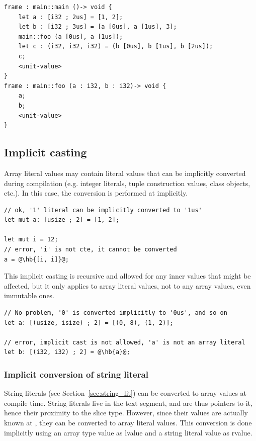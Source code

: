 \begin{lstlisting}[style=myilVerb]
frame : main::main ()-> void {
    let a : [i32 ; 2us] = [1, 2];
    let b : [i32 ; 3us] = [a [0us], a [1us], 3];
    main::foo (a [0us], a [1us]);
    let c : (i32, i32, i32) = (b [0us], b [1us], b [2us]);
    c;
    <unit-value>
}
frame : main::foo (a : i32, b : i32)-> void {
    a;
    b;
    <unit-value>
}
\end{lstlisting}


\subsection{Implicit casting}

Array literal values may contain literal values that can be implicitly
converted during compilation (e.g. integer literals, tuple construction values,
class objects, etc.). In this case, the conversion is performed at 
implicitly.

\begin{lstlisting}[style=coloredverbatimError, escapechar=@]
// ok, '1' literal can be implicitly converted to '1us'
let mut a: [usize ; 2] = [1, 2];

let mut i = 12;
// error, 'i' is not cte, it cannot be converted
a = @\hb{[i, i]}@;
\end{lstlisting}

This implicit casting is recursive and allowed for any inner values that might
be affected, but it only applies to array literal values, not to any array
values, even immutable ones.

\begin{lstlisting}[style=coloredverbatimError, escapechar=@]
// No problem, '0' is converted implicitly to '0us', and so on
let a: [(usize, isize) ; 2] = [(0, 8), (1, 2)];

// error, implicit cast is not allowed, 'a' is not an array literal
let b: [(i32, i32) ; 2] = @\hb{a}@;
\end{lstlisting}

\subsubsection{Implicit conversion of string literal}

String literals (see Section~\ref{sec:string_lit}) can be converted to array
values at compile time. String literals live in the text segment, and are
thus pointers to it, hence their proximity to the slice type. However, since their
values are actually known at , they can be converted to array
literal values. This conversion is done implicitly using an array type value as
lvalue and a  string literal value as rvalue.

